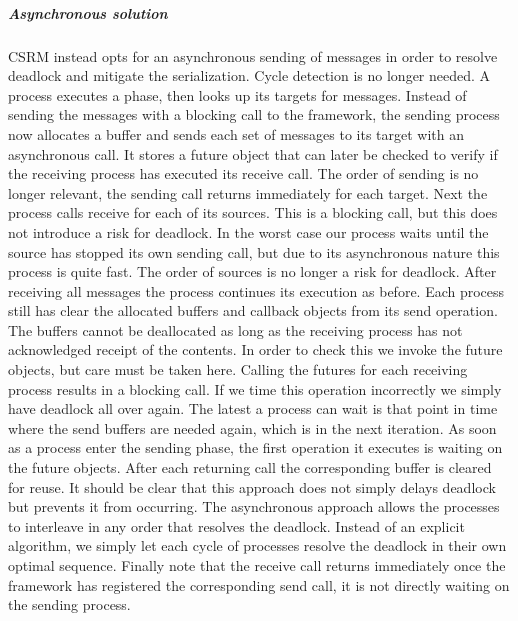 \subparagraph{Asynchronous solution}
CSRM instead opts for an asynchronous sending of messages in order to resolve deadlock and mitigate the serialization. Cycle detection is no longer needed. 
A process executes a phase, then looks up its targets for messages. Instead of sending the messages with a blocking call to the framework, the sending process now allocates a buffer and sends each set of messages to its target with an asynchronous call. It stores a future object that can later be checked to verify if the receiving process has executed its receive call. 
The order of sending is no longer relevant, the sending call returns immediately for each target. 
Next the process calls receive for each of its sources. This is a blocking call, but this does not introduce a risk for deadlock.
In the worst case our process waits until the source has stopped its own sending call, but due to its asynchronous nature this process is quite fast. The order of sources is no longer a risk for deadlock. After receiving all messages the process continues its execution as before.
Each process still has clear the allocated buffers and callback objects from its send operation. The buffers cannot be deallocated as long as the receiving process has not acknowledged receipt of the contents. In order to check this we invoke the future objects, but care must be taken here. Calling the futures for each receiving process results in a blocking call. If we time this operation incorrectly we simply have deadlock all over again. The latest a process can wait is that point in time where the send buffers are needed again, which is in the next iteration. As soon as a process enter the sending phase, the first operation it executes is waiting on the future objects. After each returning call the corresponding buffer is cleared for reuse. 
It should be clear that this approach does not simply delays deadlock but prevents it from occurring. The asynchronous approach allows the processes to interleave in any order that resolves the deadlock. Instead of an explicit algorithm, we simply let each cycle of processes resolve the deadlock in their own optimal sequence. Finally note that the receive call returns immediately once the framework has registered the corresponding send call, it is not directly waiting on the sending process.

